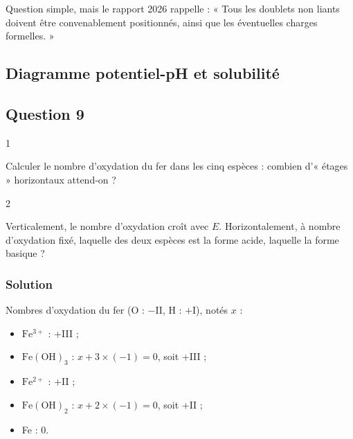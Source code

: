 \documentclass[11pt,a4paper]{article}
\providecommand{\tightlist}{\setlength{\itemsep}{0pt}\setlength{\parskip}{0pt}}
\begin{document}
\begin{jury}

Question simple, mais le rapport 2026 rappelle : « Tous les doublets non liants doivent être convenablement positionnés, ainsi que les éventuelles charges formelles. »

\end{jury}

\hypertarget{diagramme-potentiel-ph-et-solubilituxe9}{%
\subsection{Diagramme potentiel-pH et solubilité}\label{diagramme-potentiel-ph-et-solubilituxe9}}

\hypertarget{question-9}{%
\subsection{Question 9}\label{question-9}}

\begin{indication}{1}

Calculer le nombre d'oxydation du fer dans les cinq espèces : combien d'« étages » horizontaux attend-on ?

\end{indication}

\begin{indication}{2}

Verticalement, le nombre d'oxydation croît avec \(E\). Horizontalement, à nombre d'oxydation fixé, laquelle des deux espèces est la forme acide, laquelle la forme basique ?

\end{indication}

\hypertarget{solution-8}{%
\subsubsection{Solution}\label{solution-8}}

Nombres d'oxydation du fer (O : −II, H : +I), notés \(x\) :

\begin{itemize}
\tightlist
\item
  \(\mathrm{Fe^{3+}}\) : +III ;
\item
  \(\mathrm{Fe(OH)_3}\) : \(x+3\times(-1)=0\), soit +III ;
\item
  \(\mathrm{Fe^{2+}}\) : +II ;
\item
  \(\mathrm{Fe(OH)_2}\) : \(x+2\times(-1)=0\), soit +II ;
\item
  Fe : 0.
\end{itemize}
\end{document}
